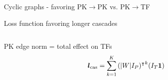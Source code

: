 \begin{frame}{Cyclic graphs - favoring PK$\rightarrow$PK vs. PK$\rightarrow$TF}

\end{frame}
\begin{frame}{Loss function favoring longer cascades}
\label{sec:cascade_loss}
\begin{columns}
\begin{column}{0.65\textwidth}



PK edge norm = total effect on TFs
\begin{equation}
\label{eq:pk_effect}
\boldsymbol{l}_{\text{cas}} =
\sum_{k=1}^K {(|W|I_P)^\intercal}^k
(I_T \boldsymbol{1} )
\end{equation}



\end{column}
\end{columns}
\end{frame}

